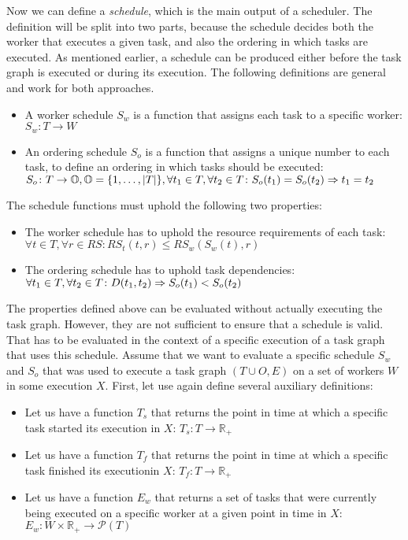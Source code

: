 Now we can define a \emph{schedule}, which is the main output of a scheduler. The definition
will be split into two parts, because the schedule decides both the worker that executes a given
task, and also the ordering in which tasks are executed. As mentioned earlier, a schedule can be
produced either before the task graph is executed or during its execution. The following
definitions are general and work for both approaches.

\begin{itemize}
	\item A worker schedule $S_w$ is a function that assigns each task to a specific worker:
	      $S_w\colon T \rightarrow W$
	\item An ordering schedule $S_o$ is a function that assigns a unique number to each
	      task, to define an ordering in which tasks should be executed: $S_o\colon T \rightarrow \mathbb{O}, \mathbb{O} = \{1,\ldots,|T|\},
		      \forall t_1\in{}T, \forall t_2\in{}T\colon S_o(t_1) = S_o(t_2) \Rightarrow t_1 = t_2$
\end{itemize}

The schedule functions must uphold the following two properties:

\begin{itemize}
	\item The worker schedule has to uphold the resource requirements of each task: \\ $\forall t\in{}T, \forall r\in{}RS\colon RS_t(t, r) \leq
		      RS_w(S_w(t), r)$
	\item The ordering schedule has to uphold task dependencies: \\ $\forall t_1\in{}T, \forall t_2\in{}T\colon D(t_1, t_2) \Rightarrow S_o(t_1) < S_o(t_2)$
\end{itemize}

The properties defined above can be evaluated without actually executing the task graph. However,
they are not sufficient to ensure that a schedule is valid. That has to be evaluated in the context
of a specific execution of a task graph that uses this schedule. Assume that we want to evaluate a
specific schedule $S_w$ and $S_o$ that was used to execute a task
graph $(T \cup O, E)$ on a set of workers $W$ in some execution
$X$. First, let use again define several auxiliary definitions:

\newcommand{\timedomain}{\mathbb{R_{+}}}

\begin{itemize}
	\item Let us have a function $T_s$ that returns the point in time at which a specific
	      task started its execution in $X$: $T_s\colon T \rightarrow \timedomain$
	\item Let us have a function $T_f$ that returns the point in time at which a specific
	      task finished its executionin $X$: $T_f\colon T \rightarrow \timedomain$
	\item Let us have a function $E_w$ that returns a set of tasks that were currently being
	      executed on a specific worker at a given point in time in $X$:
	      $E_w\colon W \times \timedomain \rightarrow \mathcal{P}(T)$
\end{itemize}

